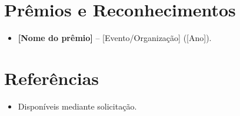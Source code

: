 \documentclass[11pt,a4paper,sans]{moderncv}
\begin{document}

\section{Prêmios e Reconhecimentos}
\vspace{1pt}
\begin{itemize}
\item{\textbf{[Nome do prêmio]} -- [Evento/Organização] ([Ano]).}
\end{itemize}


\section{Referências}
\vspace{1pt}
\begin{itemize}
\item{Disponíveis mediante solicitação.}
\end{itemize}
\end{document}
